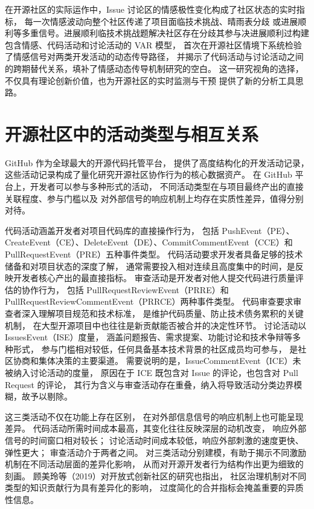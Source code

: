 \documentclass[
    type = master, %
    degree = professional,        %
    decl-page,  %
    twoside,                %
    fontset = fandol %
  ]{njuthesis}
\begin{document}
在开源社区的实际运作中，Issue 讨论区的情感极性变化构成了社区状态的实时指标，
每一次情感波动向整个社区传递了项目面临技术挑战、晴雨表分歧
或进展顺利等多重信号。进展顺利临技术挑战题解决社区存在分歧其参与决进展顺利过构建包含情感、代码活动和讨论活动的 VAR 模型，
首次在开源社区情境下系统检验了情感信号对两类开发活动的动态传导路径，
并揭示了代码活动与讨论活动之间的跨期替代关系，填补了情感动态传导机制研究的空白。
这一研究视角的选择，不仅具有理论创新价值，也为开源社区的实时监测与干预
提供了新的分析工具思路。

\section{开源社区中的活动类型与相互关系}

GitHub 作为全球最大的开源代码托管平台，
提供了高度结构化的开发活动记录，
这些活动记录构成了量化研究开源社区协作行为的核心数据资产\cite{alami2024sustainability}。
在 GitHub 平台上，开发者可以参与多种形式的活动，
不同活动类型在与项目最终产出的直接关联程度、参与门槛以及
对外部信号的响应机制上均存在实质性差异，值得分别对待。

代码活动涵盖开发者对项目代码库的直接操作行为，
包括 PushEvent（PE）、CreateEvent（CE）、DeleteEvent（DE）、CommitCommentEvent（CCE）和 PullRequestEvent（PRE）五种事件类型。
代码活动要求开发者具备足够的技术储备和对项目状态的深度了解，
通常需要投入相对连续且高度集中的时间，是反映开发者核心产出的最直接指标。
审查活动是开发者对他人提交代码进行质量评估的协作行为，
包括 PullRequestReviewEvent（PRRE）和 PullRequestReviewCommentEvent（PRRCE）两种事件类型。
代码审查要求审查者深入理解项目规范和技术标准，
是维护代码质量、防止技术债务累积的关键机制，
在大型开源项目中也往往是新贡献能否被合并的决定性环节。
讨论活动以 IssuesEvent（ISE）度量，
涵盖问题报告、需求提案、功能讨论和技术争辩等多种形式，
参与门槛相对较低，任何具备基本技术背景的社区成员均可参与，
是社区协商和集体决策的主要渠道。
需要说明的是，IssueCommentEvent（ICE）未被纳入讨论活动的度量，
原因在于 ICE 既包含对 Issue 的评论，也包含对 Pull Request 的评论，
其行为含义与审查活动存在重叠，纳入将导致活动分类边界模糊，故予以剔除。

这三类活动不仅在功能上存在区别，
在对外部信息信号的响应机制上也可能呈现差异。
代码活动所需时间成本最高，其变化往往反映深层的动机改变，
响应外部信号的时间窗口相对较长；
讨论活动时间成本较低，响应外部刺激的速度更快、弹性更大；
审查活动介于两者之间。
对三类活动分别建模，有助于揭示不同激励机制在不同活动层面的差异化影响，
从而对开源开发者行为结构作出更为细致的刻画\cite{schroter2010}。
顾美玲等（2019）对开放式创新社区的研究也指出，
社区治理机制对不同类型的知识贡献行为具有差异化的影响，
过度简化的合并指标会掩盖重要的异质性信息\cite{gu2019governance}。
\end{document}
